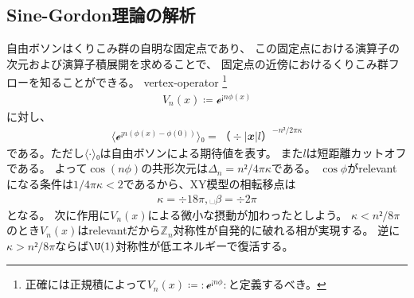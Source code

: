 \documentclass[12pt]{ltjsarticle}
\begin{document}


\subsection*{Sine-Gordon理論の解析}
自由ボソンはくりこみ群の自明な固定点であり、
この固定点における演算子の次元および演算子積展開を求めることで、
固定点の近傍におけるくりこみ群フローを知ることができる。
vertex-operator \footnote{
    正確には正規積によって$V_n(x) ≔ {:ℯ^{¡nϕ}:}$と定義するべき。
}
\begin{align}
    V_n(x) ≔ ℯ^{¡nϕ(x)}
\end{align}
に対し、
\begin{align}
    ⟨ℯ^{¡n(ϕ(x)-ϕ(0))}⟩₀
    = （÷{|𝒙|}{l}）^{-n²/2πκ}
\end{align}
である。ただし$⟨⋅⟩₀$は自由ボソンによる期待値を表す。
また$l$は短距離カットオフである。
よって$\cos(nϕ)$の共形次元は$Δ_n = n²/4πκ$である。
$\cos ϕ $がrelevantになる条件は$1/4πκ < 2$であるから、XY模型の相転移点は
\begin{align}
    κ = ÷{1}{8π},␣ β = ÷{2}{π}
\end{align}
となる。
次に作用に$V_n(x)$による微小な摂動が加わったとしよう。
$κ < n²/8π$のとき$V_n(x)$はrelevantだから$ℤ_n$対称性が自発的に破れる相が実現する。
逆に$κ > n²/8π$ならば$\U(1)$対称性が低エネルギーで復活する。
\end{document}
